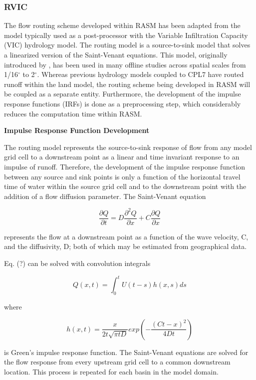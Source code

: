 \subsubsection{RVIC}

The flow routing scheme developed within RASM has been adapted from the model typically used as a post-processor with the Variable Infiltration Capacity (VIC) hydrology model.
The routing model is a source-to-sink model that solves a linearized version of the Saint-Venant equations.
This model, originally introduced by \cite{LOHMANN_1996,LOHMANN_1998,LOHMANN_1998}, has been used in many offline studies across spatial scales from 1/16$^{\circ}$ to 2$^{\circ}$.
Whereas previous hydrology models coupled to CPL7 have routed runoff within the land model, the routing scheme being developed in RASM will be coupled as a separate entity. 
Furthermore, the development of the impulse response functions (IRFs) is done as a preprocessing step, which considerably reduces the computation time within RASM.

\textbf{Impulse Response Function Development}

The routing model represents the source-to-sink response of flow from any model grid cell to a downstream point as a linear and time invariant response to an impulse of runoff.
Therefore, the development of the impulse response function between any source and sink points is only a function of the horizontal travel time of water within the source grid cell and to the downstream point with the addition of a flow diffusion parameter.
The Saint-Venant equation

\[ \frac{\partial Q}{\partial t} = D \frac{\partial^2 Q}{\partial x} + C \frac{\partial Q}{\partial x}\]

represents the flow at a downstream point as a function of the wave velocity, C, and the diffusivity, D; both of which may be estimated from geographical data.

Eq. (?) can be solved with convolution integrals

\[ Q(x,t) = \int_0^t U(t-s)h(x,s)ds \]

where

\[ h(x, t) = \frac{x}{2t\sqrt{\pi tD}}exp\left(-\frac{(Ct-x)^2}{4Dt}\right) \]

is Green’s impulse response function.
The Saint-Venant equations are solved for the flow response from every upstream grid cell to a common downstream location.
This process is repeated for each basin in the model domain.

